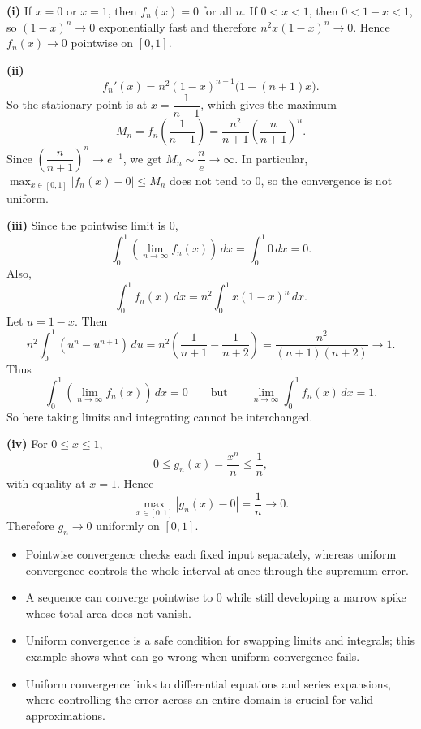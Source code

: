 \begin{solution}
\textbf{(i)} If $x=0$ or $x=1$, then $f_n(x)=0$ for all $n$. If $0<x<1$, then $0<1-x<1$, so $(1-x)^n\to 0$ exponentially fast and therefore $n^2x(1-x)^n\to 0$. Hence $f_n(x)\to 0$ pointwise on $[0,1]$.

\textbf{(ii)}
\[
f_n'(x)=n^2(1-x)^{n-1}\bigl(1-(n+1)x\bigr).
\]
So the stationary point is at $x=\dfrac{1}{n+1}$, which gives the maximum
\[
M_n=f_n\!\left(\frac{1}{n+1}\right)=\frac{n^2}{n+1}\left(\frac{n}{n+1}\right)^n.
\]
Since $\left(\dfrac{n}{n+1}\right)^n\to e^{-1}$, we get $M_n\sim \dfrac{n}{e}\to\infty$. In particular, $\max_{x\in[0,1]}|f_n(x)-0| \leq M_n$ does not tend to $0$, so the convergence is not uniform.

\textbf{(iii)} Since the pointwise limit is $0$,
\[
\int_0^1 \left(\lim_{n\to\infty} f_n(x)\right)\,dx=\int_0^1 0\,dx=0.
\]
Also,
\[
\int_0^1 f_n(x)\,dx=n^2\int_0^1 x(1-x)^n\,dx.
\]
Let $u=1-x$. Then
\[
n^2\int_0^1 (u^n-u^{n+1})\,du
=n^2\left(\frac{1}{n+1}-\frac{1}{n+2}\right)
=\frac{n^2}{(n+1)(n+2)}\to 1.
\]
Thus
\[
\int_0^1 \left(\lim_{n\to\infty} f_n(x)\right)\,dx=0
\qquad \text{but} \qquad
\lim_{n\to\infty}\int_0^1 f_n(x)\,dx=1.
\]
So here taking limits and integrating cannot be interchanged.

\textbf{(iv)} For $0\le x\le 1$,
\[
0\le g_n(x)=\frac{x^n}{n}\le \frac{1}{n},
\]
with equality at $x=1$. Hence
\[
\max_{x\in[0,1]}|g_n(x)-0|=\frac{1}{n}\to 0.
\]
Therefore $g_n\to 0$ uniformly on $[0,1]$.
\end{solution}

\begin{takeaways}
\begin{itemize}[leftmargin=*]
\item Pointwise convergence checks each fixed input separately, whereas uniform convergence controls the whole interval at once through the supremum error.
\item A sequence can converge pointwise to $0$ while still developing a narrow spike whose total area does not vanish.
\item Uniform convergence is a safe condition for swapping limits and integrals; this example shows what can go wrong when uniform convergence fails.
\item Uniform convergence links to differential equations and series expansions, where controlling the error across an entire domain is crucial for valid approximations.
\end{itemize}
\end{takeaways}


